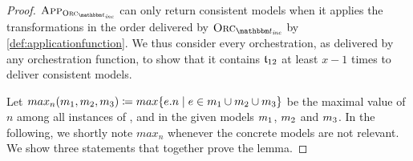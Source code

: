 \begin{proof}
    $\appfunction{\orcfunction{\transformationset{T}_\mathvariable{inc}}}$ can only return consistent models when it applies the transformations in the order delivered by $\orcfunction{\transformationset{T}_\mathvariable{inc}}$ by \autoref{def:applicationfunction}.
    We thus consider every orchestration, as delivered by any orchestration function, to show that it contains $\transformation{t}_{12}$ at least $x-1$ times to deliver consistent models.
    
    Let $max_n(\model{m}{1},\model{m}{2},\model{m}{3}) \equalsperdefinition max\setted{e.n \mid e \in \model{m}{1} \cup \model{m}{2} \cup \model{m}{3}}$ be the maximal value of $n$ among all instances of ,  and  in the given models $\model{m}{1}$, $\model{m}{2}$ and $\model{m}{3}$. In the following, we shortly note $max_n$ whenever the concrete models are not relevant. We show three statements that together prove the lemma.


\end{proof}
